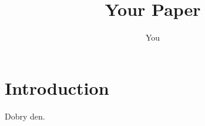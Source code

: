 \documentclass{article}
\title{Your Paper}
\author{You}
\begin{document}
\maketitle

\section{Introduction}

Dobry den.
\end{document}
